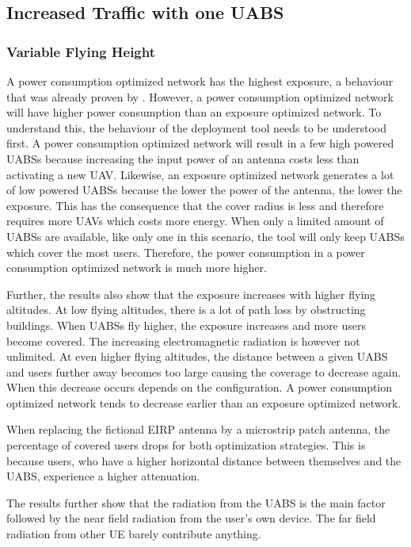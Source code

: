\documentclass[twocolumn]{phdsymp} %
\begin{document}
\subsection{Increased Traffic with one UABS}
\subsubsection{Variable Flying Height}
A power consumption optimized network has the highest exposure, a behaviour that was already proven by \cite{J1}. 
However, a power consumption optimized network will have higher power consumption than an exposure optimized network. 
To understand this, the behaviour of the deployment tool needs to be understood first. 
A power consumption optimized network will result in a few high powered \gls{UABS}s because increasing the input power of an antenna costs 
less than activating a new  \gls{UAV}. Likewise, an exposure optimized network 
generates a lot of low powered \gls{UABS}s because the lower the power of the antenna, the lower the exposure. This has the consequence that the cover radius 
is less and therefore requires more \gls{UAV}s which costs more energy.
When only a limited amount of \gls{UABS}s are available, 
like only one in this scenario, the tool will only keep \gls{UABS}s which cover the most users. 
Therefore, the power consumption in a power consumption optimized network is much more higher. 

Further, the results also show that the exposure increases with higher flying altitudes. At low flying altitudes, 
there is a lot of path loss by obstructing buildings. When 
\gls{UABS}s fly higher, the exposure increases and more users become covered. 
The increasing electromagnetic radiation is however not unlimited.
At even higher
flying altitudes, the distance between a given \gls{UABS} and users further away becomes too large causing the 
coverage to decrease again. When this decrease occurs depends on the configuration. A power consumption optimized 
network tends to decrease earlier than an exposure optimized network.

When replacing the fictional \gls{EIRP} antenna by a microstrip patch antenna, the percentage of covered users drops for both 
optimization strategies. This is because users, who have a higher horizontal distance between themselves and the \gls{UABS}, 
experience a higher attenuation.

The results further show  
that the radiation from the \gls{UABS} is the main factor followed by the near field radiation from the user's own device.
The far field radiation from other \gls{UE} barely contribute anything.
\end{document}
